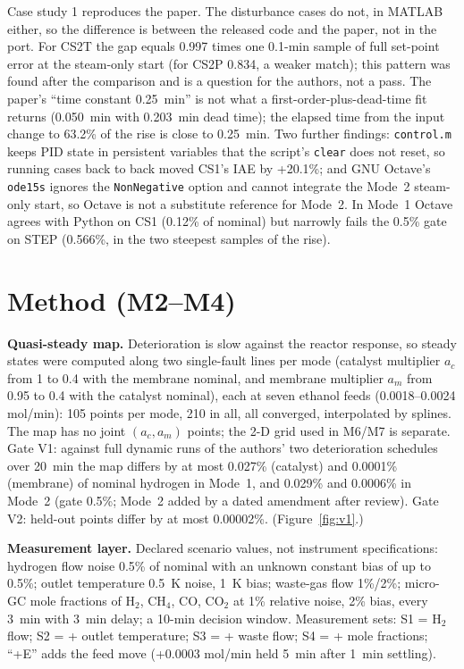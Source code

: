 \documentclass[10pt,a4paper]{article}
\begin{document}
Case study 1 reproduces the paper. The disturbance cases do not, in MATLAB either, so the difference is between the released code and the paper, not in the port. For CS2T the gap equals 0.997 times one 0.1-min sample of full set-point error at the steam-only start (for CS2P 0.834, a weaker match); this pattern was found after the comparison and is a question for the authors, not a pass. The paper's ``time constant 0.25~min'' is not what a first-order-plus-dead-time fit returns (0.050~min with 0.203~min dead time); the elapsed time from the input change to 63.2\% of the rise is close to 0.25~min. Two further findings: \texttt{control.m} keeps PID state in persistent variables that the script's \texttt{clear} does not reset, so running cases back to back moved CS1's IAE by +20.1\%; and GNU Octave's \texttt{ode15s} ignores the \texttt{NonNegative} option and cannot integrate the Mode~2 steam-only start, so Octave is not a substitute reference for Mode~2. In Mode~1 Octave agrees with Python on CS1 (0.12\% of nominal) but narrowly fails the 0.5\% gate on STEP (0.566\%, in the two steepest samples of the rise).

\section{Method (M2--M4)}
\textbf{Quasi-steady map.} Deterioration is slow against the reactor response, so steady states were computed along two single-fault lines per mode (catalyst multiplier $a_c$ from 1 to 0.4 with the membrane nominal, and membrane multiplier $a_m$ from 0.95 to 0.4 with the catalyst nominal), each at seven ethanol feeds (0.0018--0.0024 mol/min): 105 points per mode, 210 in all, all converged, interpolated by splines. The map has no joint $(a_c,a_m)$ points; the 2-D grid used in M6/M7 is separate. Gate V1: against full dynamic runs of the authors' two deterioration schedules over 20~min the map differs by at most 0.027\% (catalyst) and 0.0001\% (membrane) of nominal hydrogen in Mode~1, and 0.029\% and 0.0006\% in Mode~2 (gate 0.5\%; Mode~2 added by a dated amendment after review). Gate V2: held-out points differ by at most 0.00002\%. (Figure~\ref{fig:v1}.)

\textbf{Measurement layer.} Declared scenario values, not instrument specifications: hydrogen flow noise 0.5\% of nominal with an unknown constant bias of up to 0.5\%; outlet temperature 0.5~K noise, 1~K bias; waste-gas flow 1\%/2\%; micro-GC mole fractions of H$_2$, CH$_4$, CO, CO$_2$ at 1\% relative noise, 2\% bias, every 3~min with 3~min delay; a 10-min decision window. Measurement sets: S1 = H$_2$ flow; S2 = + outlet temperature; S3 = + waste flow; S4 = + mole fractions; ``+E'' adds the feed move (+0.0003 mol/min held 5~min after 1~min settling).
\end{document}
